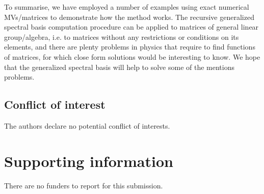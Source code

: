 \documentclass[AMA,STIX1COL]{WileyNJD-v2}
\begin{document}
To summarise, we have employed a number of examples using exact
numerical MVs/matrices to demonstrate how the method works. The recursive generalized spectral basis computation procedure can be applied to matrices of general linear
group/algebra, i.e. to matrices without any restrictions or conditions on its elements, and there are plenty problems in physics that require to find  functions of matrices, for which close form solutions would be interesting to know. We hope that the  generalized spectral basis
will help to solve some of the mentions problems.


\subsection*{Conflict of interest}

The authors declare no potential conflict of interests.


\section*{Supporting information}

There are no funders to report for this submission.

%


%
%
\end{document}
